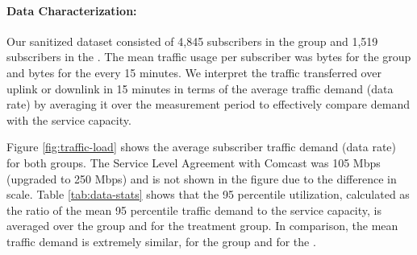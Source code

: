 \paragraph{Data Characterization: }Our sanitized dataset consisted of 4,845 
subscribers in the \control{} group and 1,519 subscribers in the \treatment{}. 
The mean traffic usage per subscriber was  bytes for the \control{} 
group and  bytes for the \treatment{} every 15 minutes. We interpret 
the traffic transferred over uplink or downlink in 15 minutes in terms of the 
average traffic demand (data rate) by averaging it over the measurement period 
to effectively compare demand with the service capacity.

Figure \ref{fig:traffic-load} shows the average subscriber traffic demand 
(data rate) for both groups. The Service Level Agreement with Comcast was 105 
Mbps (upgraded to 250 Mbps) and is not shown in the figure due to the 
difference in scale. Table \ref{tab:data-stats} shows that the 95 percentile 
utilization, calculated as the ratio of the mean 95 
percentile traffic demand to the service capacity, is  averaged 
over the \control{} group and  for the treatment group. In 
comparison, the mean traffic demand is extremely similar,  for the 
\control{} group and  for the \treatment{}.